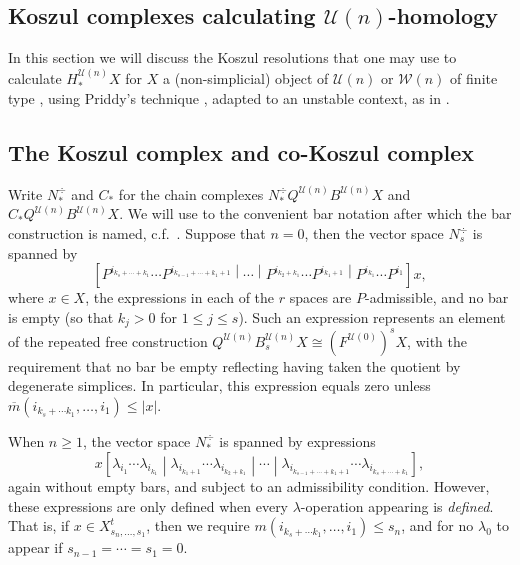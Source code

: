 \documentclass[11pt]{amsart} \renewcommand{\baselinestretch}{1.4}
\theoremstyle{plain}
\theoremstyle{definition}
\newcommand{\calU}{\mathcal{U}}
\newcommand{\calw}{\mathcal{W}}
\newcommand{\citeBOX}[2][]{\cite[\mbox{#1}]{#2}}
\newcommand{\minDimP}{\overline{m}}
\newcommand{\minDimDelta}{m}
\begin{document}
\begin{Koszul complexes}

\section{\textbf{Koszul complexes calculating $\calU(n)$-homology}}
\label{Koszul Cx section}\label{Koszul complexes}
In this section we will discuss the Koszul resolutions that one may use to calculate $H_*^{\calU(n)}X$ for $X$ a (non-simplicial)  object of $\calU(n)$ or $\calw(n)$ of finite type , using Priddy's technique \cite{PriddyKoszul.pdf}, adapted to an unstable context, as in \cite{CurtisSimplicialHtpy.pdf}.

\subsection{The Koszul complex and co-Koszul complex}
Write $N_*^\div $ and $C_*$ for the chain complexes $N_*^\div Q^{\calU(n)}B^{\calU(n)}X$ and $C_* Q^{\calU(n)}B^{\calU(n)}X$.  We will use to the convenient bar notation after which the bar construction is named, c.f.\ \citeBOX[\S7]{grpsHPin.pdf}. Suppose that $n=0$, then the vector space  $N_s^\div$ is spanned by
\[\left[P^{i_{k_s+\cdots +k_1}}\cdots P^{i_{k_{s-1}+\cdots +k_1+1}}
\middle|\cdots 
\middle|P^{i_{k_2+k_1}}\cdots P^{i_{k_1+1}}
\middle|P^{i_{k_1}}\cdots P^{i_1}\right]
x,\]
where $x\in X$, the expressions in each of the $r$ spaces are $P$-admissible, and no bar is empty (so that $k_j>0$ for $1\leq j\leq s$). Such an expression represents an element of the repeated free construction $Q^{\calU(n)}B^{\calU(n)}_sX\cong (F^{\calU(0)})^{s}X$, with the requirement that no bar be empty reflecting having taken the quotient by degenerate simplices. In particular, this expression equals zero unless $\minDimP(i_{k_s+\cdots k_1},\ldots,i_1)\leq |x|$.

When $n\geq1$, the vector space $N_*^\div$ is spanned by expressions \[x\left[\lambda_{i_1}\cdots \lambda_{i_{k_1}} 
\middle|\lambda_{i_{k_1+1}}\cdots \lambda_{i_{k_2+k_1}}
\middle|\cdots\middle|\lambda_{i_{k_{s-1}+\cdots +k_1+1}}\cdots \lambda_{i_{k_s+\cdots +k_1}}\right],
\]
again without empty bars, and subject to an admissibility condition. However, these expressions are only defined when every $\lambda$-operation appearing is \emph{defined}. That is, if $x\in X^{t}_{s_n,\ldots,s_1}$, then we require $\minDimDelta(i_{k_s+\cdots k_1},\ldots,i_1)\leq s_n$, and for no $\lambda_0$ to appear if $s_{n-1}=\cdots =s_1=0$.


\end{Koszul complexes}
\end{document}
